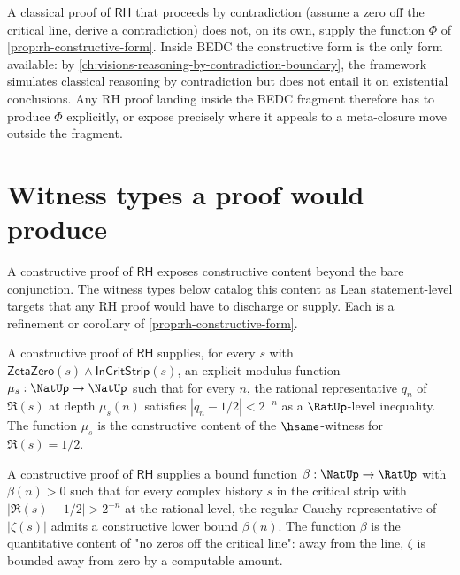 \begin{remark}
\label{rem:rh-strictly-stronger}
A classical proof of $\mathsf{RH}$ that proceeds by contradiction (assume a zero off the critical line, derive a contradiction) does not, on its own, supply the function $\Phi$ of \autoref{prop:rh-constructive-form}. Inside BEDC the constructive form is the only form available: by \autoref{ch:visions-reasoning-by-contradiction-boundary}, the framework simulates classical reasoning by contradiction but does not entail it on existential conclusions. Any RH proof landing inside the BEDC fragment therefore has to produce $\Phi$ explicitly, or expose precisely where it appeals to a meta-closure move outside the fragment.
\end{remark}

\section{Witness types a proof would produce}
\label{sec:rh-witness-types}

A constructive proof of $\mathsf{RH}$ exposes constructive content beyond the bare conjunction. The witness types below catalog this content as Lean statement-level targets that any RH proof would have to discharge or supply. Each is a refinement or corollary of \autoref{prop:rh-constructive-form}.

\begin{theorem}
\label{thm:rh-witness-modulus}
A constructive proof of $\mathsf{RH}$ supplies, for every $s$ with $\mathsf{ZetaZero}(s) \wedge \mathsf{InCritStrip}(s)$, an explicit modulus function $\mu_s : \NatUp \to \NatUp$ such that for every $n$, the rational representative $q_n$ of $\Re(s)$ at depth $\mu_s(n)$ satisfies $|q_n - 1/2| < 2^{-n}$ as a $\RatUp$-level inequality. The function $\mu_s$ is the constructive content of the $\hsame$-witness for $\Re(s) = 1/2$.
\end{theorem}

\begin{theorem}
\label{thm:rh-witness-approach-rate}
A constructive proof of $\mathsf{RH}$ supplies a bound function $\beta : \NatUp \to \RatUp$ with $\beta(n) > 0$ such that for every complex history $s$ in the critical strip with $|\Re(s) - 1/2| > 2^{-n}$ at the rational level, the regular Cauchy representative of $|\zeta(s)|$ admits a constructive lower bound $\beta(n)$. The function $\beta$ is the quantitative content of "no zeros off the critical line": away from the line, $\zeta$ is bounded away from zero by a computable amount.
\end{theorem}


